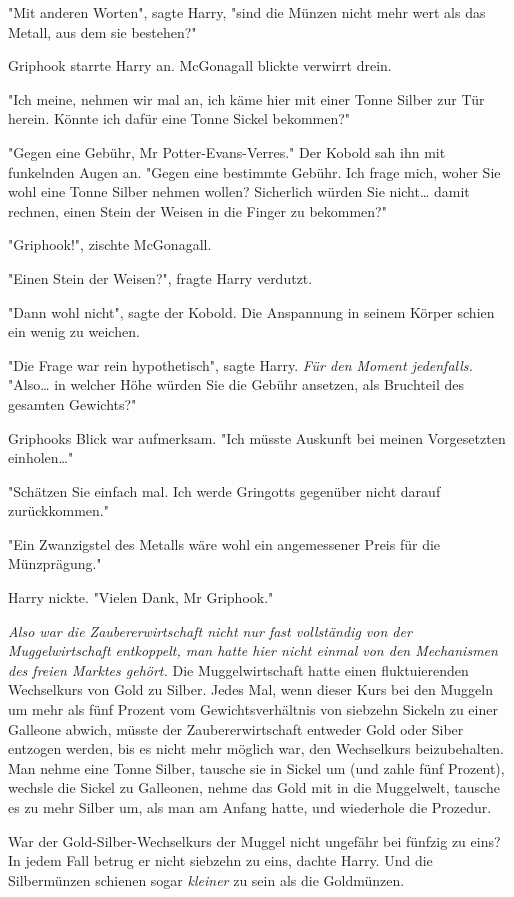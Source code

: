 {"Mit anderen Worten", sagte Harry, "sind die Münzen nicht mehr wert als das Metall, aus dem sie bestehen?"

Griphook starrte Harry an. McGonagall blickte verwirrt drein.

"Ich meine, nehmen wir mal an, ich käme hier mit einer Tonne Silber zur Tür herein. Könnte ich dafür eine Tonne Sickel bekommen?"

"Gegen eine Gebühr, Mr Potter-Evans-Verres." Der Kobold sah ihn mit funkelnden Augen an. "Gegen eine bestimmte Gebühr. Ich frage mich, woher Sie wohl eine Tonne Silber nehmen wollen? Sicherlich würden Sie nicht… damit rechnen, einen Stein der Weisen in die Finger zu bekommen?"

"Griphook!", zischte McGonagall.

"Einen Stein der Weisen?", fragte Harry verdutzt.

"Dann wohl nicht", sagte der Kobold. Die Anspannung in seinem Körper schien ein wenig zu weichen.

"Die Frage war rein hypothetisch", sagte Harry. \emph{Für den Moment jedenfalls.} "Also… in welcher Höhe würden Sie die Gebühr ansetzen, als Bruchteil des gesamten Gewichts?"

Griphooks Blick war aufmerksam. "Ich müsste Auskunft bei meinen Vorgesetzten einholen…"

"Schätzen Sie einfach mal. Ich werde Gringotts gegenüber nicht darauf zurückkommen."

"Ein Zwanzigstel des Metalls wäre wohl ein angemessener Preis für die Münzprägung."

Harry nickte. "Vielen Dank, Mr Griphook."

\emph{Also war die Zaubererwirtschaft nicht nur fast vollständig von der Muggelwirtschaft entkoppelt, man hatte hier nicht einmal von den Mechanismen des freien Marktes gehört.} Die Muggelwirtschaft hatte einen fluktuierenden Wechselkurs von Gold zu Silber. Jedes Mal, wenn dieser Kurs bei den Muggeln um mehr als fünf Prozent vom Gewichtsverhältnis von siebzehn Sickeln zu einer Galleone abwich, müsste der Zaubererwirtschaft entweder Gold oder Siber entzogen werden, bis es nicht mehr möglich war, den Wechselkurs beizubehalten. Man nehme eine Tonne Silber, tausche sie in Sickel um (und zahle fünf Prozent), wechsle die Sickel zu Galleonen, nehme das Gold mit in die Muggelwelt, tausche es zu mehr Silber um, als man am Anfang hatte, und wiederhole die Prozedur.

War der Gold-Silber-Wechselkurs der Muggel nicht ungefähr bei fünfzig zu eins? In jedem Fall betrug er nicht siebzehn zu eins, dachte Harry. Und die Silbermünzen schienen sogar \emph{kleiner} zu sein als die Goldmünzen.

}
